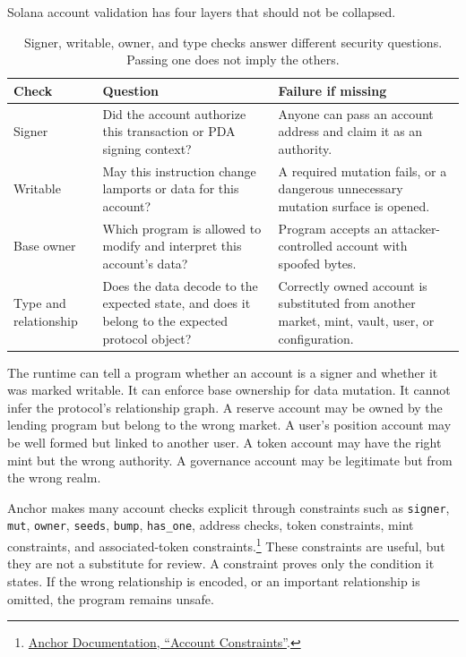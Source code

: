 Solana account validation has four layers that should not be collapsed.

\begin{table}[htbp]
\centering
\small
\renewcommand{\arraystretch}{1.18}
\begin{tabularx}{\textwidth}{@{}>{\RaggedRight\arraybackslash}p{}>{\RaggedRight\arraybackslash}p{}X@{}}
\toprule
Check & Question & Failure if missing \\
\midrule
Signer & Did the account authorize this transaction or PDA signing context? & Anyone can pass an account address and claim it as an authority. \\
Writable & May this instruction change lamports or data for this account? & A required mutation fails, or a dangerous unnecessary mutation surface is opened. \\
Base owner & Which program is allowed to modify and interpret this account's data? & Program accepts an attacker-controlled account with spoofed bytes. \\
Type and relationship & Does the data decode to the expected state, and does it belong to the expected protocol object? & Correctly owned account is substituted from another market, mint, vault, user, or configuration. \\
\bottomrule
\end{tabularx}
\caption{Signer, writable, owner, and type checks answer different security questions. Passing one does not imply the others.}
\end{table}

The runtime can tell a program whether an account is a signer and whether it was marked writable. It can enforce base ownership for data mutation. It cannot infer the protocol's relationship graph. A reserve account may be owned by the lending program but belong to the wrong market. A user's position account may be well formed but linked to another user. A token account may have the right mint but the wrong authority. A governance account may be legitimate but from the wrong realm.

Anchor makes many account checks explicit through constraints such as \texttt{signer}, \texttt{mut}, \texttt{owner}, \texttt{seeds}, \texttt{bump}, \texttt{has\_one}, address checks, token constraints, mint constraints, and associated-token constraints.\footnote{\href{https://www.anchor-lang.com/docs/references/account-constraints}{Anchor Documentation, ``Account Constraints''}.} These constraints are useful, but they are not a substitute for review. A constraint proves only the condition it states. If the wrong relationship is encoded, or an important relationship is omitted, the program remains unsafe.

